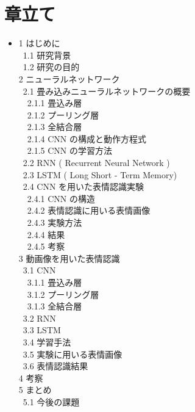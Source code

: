 \section{章立て}
\begin{itemize}
\item 1 はじめに\\
  \ 1.1 研究背景\\
  \ 1.2 研究の目的\\
  2 ニューラルネットワーク\\
  \ 2.1 畳み込みニューラルネットワークの概要\\
  \ \ 2.1.1 畳込み層\\
  \ \ 2.1.2 プーリング層\\
  \ \ 2.1.3 全結合層\\
  \ \ 2.1.4 CNN の構成と動作方程式\\
  \ \ 2.1.5 CNN の学習方法\\
  \ 2.2 RNN ( Recurrent Neural Network )\\
  \ 2.3 LSTM ( Long Short - Term Memory)\\
  \ 2.4 CNN を用いた表情認識実験\\
  \ \ 2.4.1 CNN の構造\\
  \ \ 2.4.2 表情認識に用いる表情画像\\
  \ \ 2.4.3 実験方法\\
  \ \ 2.4.4 結果\\
  \ \ 2.4.5 考察\\
  3 動画像を用いた表情認識\\
  \ 3.1 CNN\\
  \ \ 3.1.1 畳込み層\\
  \ \ 3.1.2 プーリング層\\
  \ \ 3.1.3 全結合層\\
  \ 3.2 RNN\\
  \ 3.3 LSTM\\
  \ 3.4 学習手法\\
  \ 3.5 実験に用いる表情画像\\
  \ 3.6 表情認識結果\\
  4 考察\\
  5 まとめ\\
  \ 5.1 今後の課題\\
\end{itemize}

